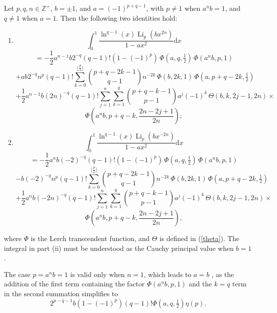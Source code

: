 \documentclass[11pt,reqno]{article}
\begin{document}
\begin{theorem}\label{from zero to one integral2}
	Let $p,q,n\in\mathbb{Z}^{+}$, $b=\pm1$, and $a={(-1)}^{p+q-1}$, with $p\neq1$ when $a^nb=1$, and $q\neq1$ when $a=1$. Then the following two identities hold:
	\begin{enumerate}
		\item[i)]
		\[\int_0^1\frac{\ln^{q-1}(x)\operatorname{Li}_p(b{x}^{2n})}{1-ax^2}\mathrm{d} x\]
		\[=-\frac12a^{n-1}b 2^{-q}(q-1)!(1-{(-1)}^{p})\,\Phi(a,q,\tfrac12)\,\Phi(a^nb,p,1)\]
		\[+ab 2^{-q} n^{p}(q-1)!\sum_{k=0}^{\lfloor\frac{p}{2}\rfloor}\binom{p+q-2k-1}{q-1}n^{-2k}\,\Phi(b,2k,1)\,\Phi(a,p+q-2k,\tfrac{1}{2})\]
		\[+\frac12 a^{n-1}b {(2n)}^{-q}(q-1)!\sum_{j=1}^{n}\sum_{k=1}^{q}\binom{p+q-k-1}{p-1}a^j{(-1)}^{k}\,\Theta(b,k,2j-1,2n)\times\]
		\[\Phi\left(a^nb,p+q-k,\frac{2n-2j+1}{2n}\right);\]
		\item[ii)]
		\[\int_0^1\frac{\ln^{q-1}(x)\operatorname{Li}_p(bx^{-2n})}{1-ax^2}\mathrm{d} x\]
		\[=-\frac12 a^n b {(-2)}^{-q}(q-1)!(1-{(-1)}^{p})\,\Phi(a,q,\tfrac12)\,\Phi(a^nb,p,1)\]
		\[-b{(-2)}^{-q}n^{p}(q-1)!\sum_{k=0}^{\lfloor\frac{p}{2}\rfloor}\binom{p+q-2k-1}{q-1}n^{-2k}\,\Phi(b,2k,1)\,\Phi(a,p+q-2k,\tfrac{1}{2})\]
		\[+\frac12a^{n}b{(-2n)}^{-q}(q-1)!\sum_{j=1}^{n}\sum_{k=1}^{q}\binom{p+q-k-1}{p-1}a^j{(-1)}^{k}\,\Theta(b,k,2j-1,2n)\times\]
		\[\Phi\left(a^nb,p+q-k,\frac{2n-2j+1}{2n}\right),\]
	\end{enumerate}						
	where $\Phi$ is the Lerch transcendent function, and $\Theta$ is defined in (\ref{theta}). The integral in part (ii) must be understood as the Cauchy principal value when $b=1$. 
\end{theorem}
\begin{remark}
	The case $p=a^nb=1$ is valid only when $n=1$, which leads to $a=b$ , as the addition of the first term containing the factor $\Phi(a^nb,p,1)$ and the $k=q$ term in the second summation simplifies to \[2^{p-q-1}b(1-{(-1)}^p)(q-1)!\Phi(a,q,\tfrac12)\eta(p).\]
\end{remark}
\end{document}
